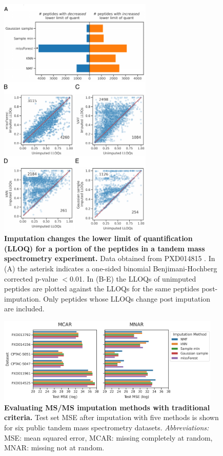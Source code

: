 \documentclass{article}
\begin{document}
\begin{figure}
\centering
\includegraphics[width=0.65\textwidth]{figures/LLOQ-figure-multipanel-export3.pdf}
\caption{{\bf Imputation changes the lower limit of quantification (LLOQ) for a portion of the peptides in a tandem mass spectrometry experiment.} Data obtained from PXD014815 \cite{matrix-matched-calib}. In (A) the asterisk indicates a one-sided binomial Benjimani-Hochberg corrected p-value $<$0.01. In (B-E) the LLOQs of unimputed peptides are plotted against the LLOQs for the same peptides post-imputation. Only peptides whose LLOQs change post imputation are included.}
\label{fig:lloq}
\end{figure}

\begin{figure}
\centering
\includegraphics[width=0.95\textwidth]{figures/traditional-barplots-plus-TMT.png}
\caption{{\bf Evaluating MS/MS imputation methods with traditional criteria.} 
Test set MSE after imputation with five methods is shown for six public tandem mass spectrometry datasets. \textit{Abbreviations:} MSE: mean squared error, MCAR: missing completely at random, MNAR: missing not at random.}
\label{fig:traditional-eval}
\end{figure}
\end{document}
